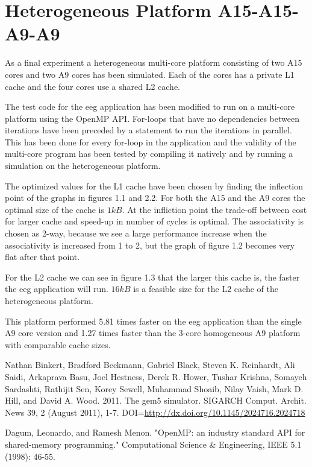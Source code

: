 \documentclass[a4paper, 10pt, conference]{ieeeconf}      %
\begin{document}
\section{Heterogeneous Platform A15-A15-A9-A9}
As a final experiment a heterogeneous multi-core platform consisting of two A15 cores and two A9 cores has been simulated. Each of the cores has a private L1 cache and the four cores use a shared L2 cache.

The test code for the eeg application has been modified to run on a multi-core platform using the OpenMP API. For-loops that have no dependencies between iterations have been preceded by a statement to run the iterations in parallel. This has been done for every for-loop in the application and the validity of the multi-core program has been tested by compiling it natively and by running a simulation on the heterogeneous platform.

The optimized values for the L1 cache have been chosen by finding the inflection point of the graphs in figures 1.1 and 2.2. For both the A15 and the A9 cores the optimal size of the cache is $1kB$. At the infliction point the trade-off between cost for larger cache and speed-up in number of cycles is optimal. The associativity is chosen as 2-way, because we see a large performance increase when the associativity is increased from 1 to 2, but the graph of figure 1.2 becomes very flat after that point.

For the L2 cache we can see in figure 1.3 that the larger this cache is, the faster the eeg application will run. $16kB$ is a feasible size for the L2 cache of the heterogeneous platform.

This platform performed 5.81 times faster on the eeg application than the single A9 core version and 1.27 times faster than the 3-core homogeneous A9 platform with comparable cache sizes.



\begin{thebibliography}{99}

 Nathan Binkert, Bradford Beckmann, Gabriel Black, Steven K. Reinhardt, Ali Saidi, Arkaprava Basu, Joel Hestness, Derek R. Hower, Tushar Krishna, Somayeh Sardashti, Rathijit Sen, Korey Sewell, Muhammad Shoaib, Nilay Vaish, Mark D. Hill, and David A. Wood. 2011. The gem5 simulator. SIGARCH Comput. Archit. News 39, 2 (August 2011), 1-7. DOI=\url{http://dx.doi.org/10.1145/2024716.2024718}

 Dagum, Leonardo, and Ramesh Menon. "OpenMP: an industry standard API for shared-memory programming." Computational Science \& Engineering, IEEE 5.1 (1998): 46-55.



\end{thebibliography}
\end{document}
